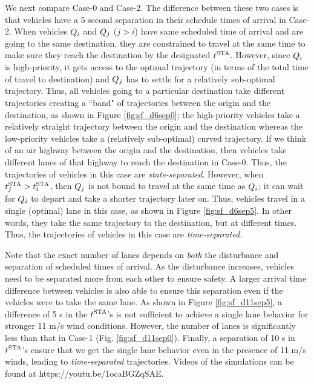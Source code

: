 We next compare Case-0 and Case-2. The difference between these two cases is that vehicles have a 5 second separation in their schedule times of arrival in Case-2. When vehicles $Q_i$ and $Q_{j}$ ($j>i$) have same scheduled time of arrival and are going to the same destination, they are constrained to travel at the same time to make sure they reach the destination by the designated $t^\text{STA}$. However, since $Q_i$ is high-priority, it gets access to the optimal trajectory (in terms of the total time of travel to destination) and $Q_{j}$ has to settle for a relatively sub-optimal trajectory. Thus, all vehicles going to a particular destination take different trajectories creating a ``band" of trajectories between the origin and the destination, as shown in Figure \ref{fig:sf_d6sep0}; the high-priority vehicles take a relatively straight trajectory between the origin and the destination whereas the low-priority vehicles take a (relatively sub-optimal) curved trajectory. If we think of an air highway between the origin and the destination, then vehicles take different lanes of that highway to reach the destination in Case-0. Thus, the trajectories of vehicles in this case are \textit{state-separated}. However, when $t^\text{STA}_j > t^\text{STA}_i$, then $Q_j$ is not bound to travel at the same time as $Q_i$; it can wait for $Q_i$ to depart and take a shorter trajectory later on. Thus, vehicles travel in a single (optimal) lane in this case, as shown in Figure \ref{fig:sf_d6sep5}. In other words, they take the same trajectory to the destination, but at different times. Thus, the trajectories of vehicles in this case are \textit{time-separated}. 

Note that the exact number of lanes depends on \textit{both} the disturbance and separation of scheduled times of arrival. As the disturbance increases, vehicles need to be separated more from each other to ensure safety. A larger arrival time difference between vehicles is also able to ensure this separation even if the vehicles were to take the same lane. As shown in Figure \ref{fig:sf_d11sep5}, a difference of 5 s in the $t^\text{STA}$'s is not sufficient to achieve a single lane behavior for stronger 11 m/s wind conditions. However, the number of lanes is significantly less than that in Case-1 (Fig. \ref{fig:sf_d11sep0}). Finally, a separation of 10 s in $t^\text{STA}$'s ensure that we get the single lane behavior even in the presence of 11 m/s winds, leading to \textit{time-separated} trajectories. Videos of the simulations can be found at https://youtu.be/1ocaBGZqSAE.

